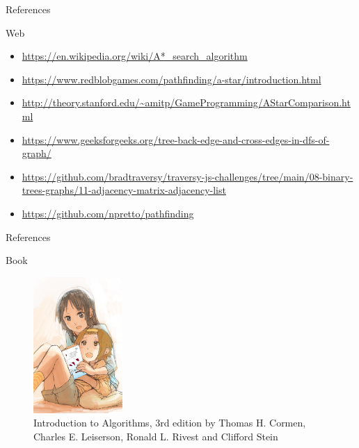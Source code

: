 \documentclass[ignorenonframetext,]{beamer}
\providecommand{\tightlist}{%
  \setlength{\itemsep}{0pt}\setlength{\parskip}{0pt}}
\begin{document}
\begin{frame}{References}
\protect\hypertarget{references}{}

\begin{block}{Web}

\begin{itemize}
\tightlist
\item
  \url{https://en.wikipedia.org/wiki/A*_search_algorithm}
\item
  \url{https://www.redblobgames.com/pathfinding/a-star/introduction.html}
\item
  \url{http://theory.stanford.edu/~amitp/GameProgramming/AStarComparison.html}
\item
  \url{https://www.geeksforgeeks.org/tree-back-edge-and-cross-edges-in-dfs-of-graph/}
\item
  \url{https://github.com/bradtraversy/traversy-js-challenges/tree/main/08-binary-trees-graphs/11-adjacency-matrix-adjacency-list}
\item
  \url{https://github.com/npretto/pathfinding}
\end{itemize}

\end{block}

\end{frame}

\begin{frame}{References}
\protect\hypertarget{references-1}{}

\begin{block}{Book}

\begin{figure}
\centering
\includegraphics[width=\textwidth,height=2.04167in]{K_on_girls_reading_cormen_algorithms.jpg}
\caption{Introduction to Algorithms, 3rd edition by Thomas H. Cormen,
Charles E. Leiserson, Ronald L. Rivest and Clifford Stein}
\end{figure}

\end{block}

\end{frame}
\end{document}
